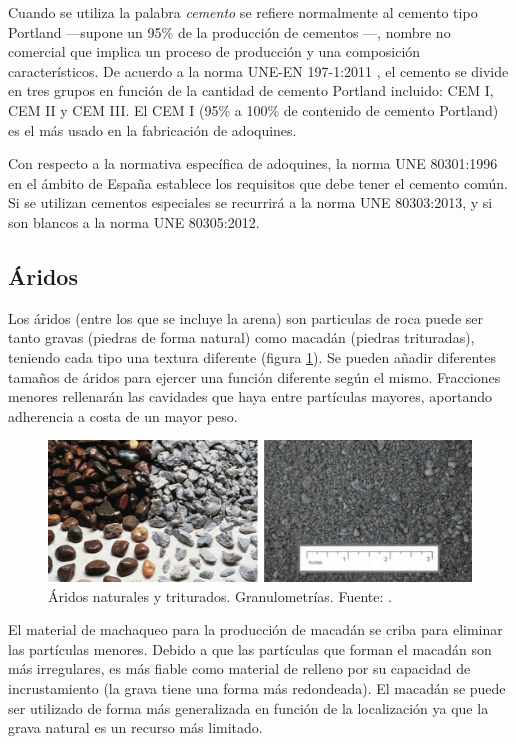 Cuando se utiliza la palabra \emph{cemento} se refiere normalmente al cemento tipo Portland —supone un 95\% de la producción de cementos \cite{jsjunnesson}—, nombre no comercial que implica un proceso de producción y una composición característicos. De acuerdo a la norma UNE-EN 197-1:2011 \cite{une1971}, el cemento se divide en tres grupos en función de la cantidad de cemento Portland incluido: CEM I, CEM II y CEM III. El CEM I (95\% a 100\% de contenido de cemento Portland) es el más usado en la fabricación de adoquines.

Con respecto a la normativa específica de adoquines, la norma UNE 80301:1996 \cite{une80301} en el ámbito de España establece los requisitos que debe tener el cemento común. Si se utilizan cementos especiales se recurrirá a la norma UNE 80303:2013, y si son blancos a la norma UNE 80305:2012.

\subsection{Áridos}
Los áridos (entre los que se incluye la arena) son particulas de roca puede ser tanto gravas (piedras de forma natural) como macadán (piedras trituradas), teniendo cada tipo una textura diferente (figura \ref{fig:aridosnaturalesytriturados}). Se pueden añadir diferentes tamaños de áridos para ejercer una función diferente según el mismo. Fracciones menores rellenarán las cavidades que haya entre partículas mayores, aportando adherencia a costa de un mayor peso.

\begin{figure}[!htb]
\centering
\includegraphics[width=13cm]{img/aridos.png}
\caption[Áridos naturales y triturados. Granulometrías.]{Áridos naturales y triturados. Granulometrías. Fuente: \cite{sustpave}.}
\label{fig:aridosnaturalesytriturados}
\end{figure}

El material de machaqueo para la producción de macadán se criba para eliminar las partículas menores. Debido a que las partículas que forman el macadán son más irregulares, es más fiable como material de relleno por su capacidad de incrustamiento (la grava tiene una forma más redondeada). El macadán se puede ser utilizado de forma más generalizada en función de la localización ya que la grava natural es un recurso más limitado.

